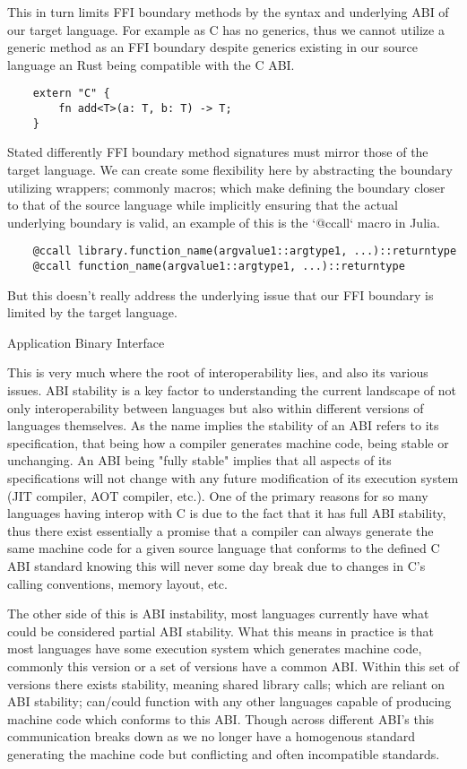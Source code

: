 This in turn limits FFI boundary methods by the syntax and underlying ABI of our target language. For example as C has no generics, thus we cannot utilize a generic method as an FFI boundary despite generics existing in our source language an Rust being compatible with the C ABI. 

\begin{lstlisting}
    extern "C" { 
        fn add<T>(a: T, b: T) -> T; 
    }
\end{lstlisting}
Stated differently FFI boundary method signatures must mirror those of the target language. We can create some flexibility here by abstracting the boundary utilizing wrappers; commonly macros; which make defining the boundary closer to that of the source language while implicitly ensuring that the actual underlying boundary is valid, an example of this is the `@ccall` macro in Julia.
\begin{lstlisting}
    @ccall library.function_name(argvalue1::argtype1, ...)::returntype
    @ccall function_name(argvalue1::argtype1, ...)::returntype
\end{lstlisting}

But this doesn't really address the underlying issue that our FFI boundary is limited by the target language. 

Application Binary Interface 

This is very much where the root of interoperability lies, and also its various issues. ABI stability is a key factor to understanding the current landscape of not only interoperability between languages but also within different versions of languages themselves. As the name implies the stability of an ABI refers to its specification, that being how a compiler generates machine code, being stable or unchanging. An ABI being "fully stable" implies that all aspects of its specifications will not change with any future modification of its execution system (JIT compiler, AOT compiler, etc.). One of the primary reasons for so many languages having interop with C is due to the fact that it has full ABI stability, thus there exist essentially a promise that a compiler can always generate the same machine code for a given source language that conforms to the defined C ABI standard knowing this will never some day break due to changes in C's calling conventions, memory layout, etc. 

The other side of this is ABI instability, most languages currently have what could be considered partial ABI stability. What this means in practice is that most languages have some execution system which generates machine code, commonly this version or a set of versions have a common ABI. Within this set of versions there exists stability, meaning shared library calls; which are reliant on ABI stability; can/could function with any other languages capable of producing machine code which conforms to this ABI. Though across different ABI's this communication breaks down as we no longer have a homogenous standard generating the machine code but conflicting and often incompatible standards. 

